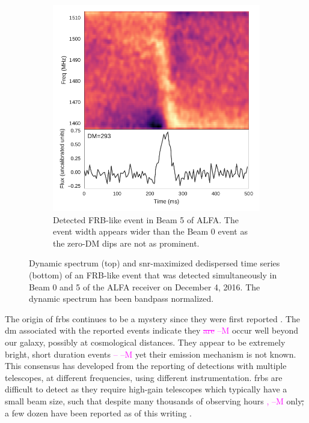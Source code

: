 \documentclass[a4paper,fleqn,usenatbib]{mnras}
\newcommand{\cM}[1]{\textcolor{magenta}{ #1 --M}}
\begin{document}
\begin{figure}
\begin{subfigure}[t]{0.45\textwidth}
        \includegraphics[width=1.0\textwidth]{figures/D20161204_buf4_Beam5.pdf}
        \caption{Detected FRB-like event in Beam 5 of ALFA. The event width
        appears wider than the Beam 0 event as the zero-DM dips are not as
        prominent.
        }
        \label{fig:beam5_dynamic_spec}
    \end{subfigure}
    \caption{
    Dynamic spectrum (top) and \gls{snr}-maximized dedispersed time series
    (bottom) of an FRB-like event that was detected simultaneously in Beam 0 and
    5 of the ALFA receiver on December 4, 2016. The dynamic spectrum has been
    bandpass normalized.
    }
    \label{fig:dynamic_spec}
\end{figure}

The origin of \glspl{frb} continues to be a mystery since they were first
reported \citep{2007Sci...318..777L}. The \gls{dm} associated with the reported
events indicate they \cM{\sout{are}} occur well beyond our galaxy, possibly at cosmological
distances. They appear to be extremely bright, short duration events \cM{--} yet their
emission mechanism is not known.  This consensus has developed from the
reporting of detections with multiple telescopes, at different frequencies,
using different instrumentation. \glspl{frb} are difficult to detect as they
require high-gain telescopes which typically have a small beam size, such that
despite many thousands of observing hours\cM{,} only\sout{,} a few dozen have been reported
as of this writing \citep{2016PASA...33...45P}.
\end{document}
